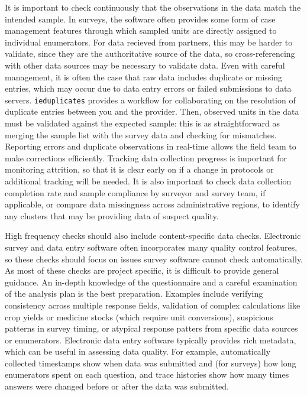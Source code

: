 It is important to check continuously that the observations in the data match the intended sample.
In surveys, the software often provides some form of case management features
through which sampled units are directly assigned to individual enumerators.
For data recieved from partners, this may be harder to validate,
since they are the authoritative source of the data,
so cross-referencing with other data sources may be necessary to validate data.
Even with careful management, it is often the case that raw data includes duplicate or missing entries,
which may occur due to data entry errors or failed submissions to data servers.
\texttt{ieduplicates}
provides a workflow for collaborating on the resolution of duplicate entries between you and the provider.
Then, observed units in the data must be validated against the expected sample:
this is as straightforward as merging the sample list with the survey data and checking for mismatches.
Reporting errors and duplicate observations in real-time allows the field team to make corrections efficiently.
Tracking data collection progress is important for monitoring attrition,
so that it is clear early on if a change in protocols or additional tracking will be needed.
It is also important to check data collection completion rate
and sample compliance by surveyor and survey team, if applicable,
or compare data missingness across administrative regions,
to identify any clusters that may be providing data of suspect quality.

High frequency checks should also include content-specific data checks.
Electronic survey and data entry software often incorporates many quality control features,
so these checks should focus on issues survey software cannot check automatically.
As most of these checks are project specific,
it is difficult to provide general guidance.
An in-depth knowledge of the questionnaire and a careful examination of the analysis plan
is the best preparation.
Examples include verifying consistency across multiple response fields,
validation of complex calculations like crop yields or medicine stocks (which require unit conversions),
suspicious patterns in survey timing,
or atypical response patters from specific data sources or enumerators.
Electronic data entry software typically provides rich metadata,
which can be useful in assessing data quality.
For example, automatically collected timestamps show when data was submitted
and (for surveys) how long enumerators spent on each question,
and trace histories show how many
times answers were changed before or after the data was submitted.

